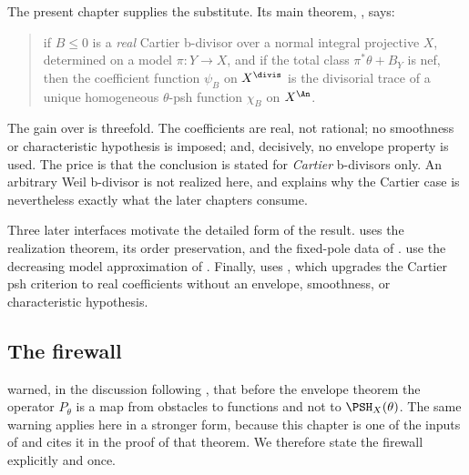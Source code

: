 The present chapter supplies the substitute.  Its main theorem,
, says:

\begin{quote}
if $B\leq0$ is a \emph{real} Cartier b-divisor over a normal integral
projective $X$, determined on a model $\pi:Y\to X$, and if the total
class $\pi^*\theta+B_Y$ is nef, then the coefficient function
$\psi_B$ on $X^{\divis}$ is the divisorial trace of a unique
homogeneous $\theta$-psh function $\chi_B$ on $X^{\An}$.
\end{quote}

The gain over  is threefold.  The
coefficients are real, not rational; no smoothness or characteristic
hypothesis is imposed; and, decisively, no envelope property is used.  The
price is that the conclusion is stated for \emph{Cartier} b-divisors only.
An arbitrary Weil b-divisor is not realized here, and
 explains why the Cartier case is
nevertheless exactly what the later chapters consume.

Three later interfaces motivate the detailed form of the result.
 uses the realization theorem, its order
preservation, and the fixed-pole data of .
use the decreasing model approximation of
.  Finally,
 uses
, which upgrades the
Cartier psh criterion to real coefficients without an envelope, smoothness,
or characteristic hypothesis.

\subsection{The firewall}
\label{sec:ch38-firewall}

 warned, in the discussion following
, that before the envelope theorem the
operator $P_\theta$ is a map from obstacles to functions and not to
$\PSH_X(\theta)$.  The same warning applies here in a stronger form,
because this chapter is one of the inputs of
 and 
cites it in the proof of that theorem.  We therefore state the firewall
explicitly and once.

